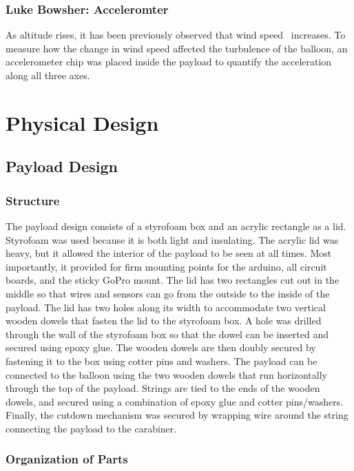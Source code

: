 \documentclass[12pt,]{article}
\begin{document}
\subsubsection{Luke Bowsher:
Acceleromter}\label{luke-bowsher-acceleromter}

As altitude rises, it has been previously observed that wind speed
~increases. To measure how the change in wind speed affected the
turbulence of the balloon, an accelerometer chip was placed inside the
payload to quantify the acceleration along all three axes.

\section{Physical Design}\label{physical-design}

\subsection{Payload Design}\label{payload-design}

\subsubsection{Structure}\label{structure}

The payload design consists of a styrofoam box and an acrylic rectangle
as a lid. Styrofoam was used because it is both light and insulating.
The acrylic lid was heavy, but it allowed the interior of the payload to
be seen at all times. Most importantly, it provided for firm mounting
points for the arduino, all circuit boards, and the sticky GoPro mount.
The lid has two rectangles cut out in the middle so that wires and
sensors can go from the outside to the inside of the payload. The lid
has two holes along its width to accommodate two vertical wooden dowels
that fasten the lid to the styrofoam box. A hole was drilled through the
wall of the styrofoam box so that the dowel can be inserted and secured
using epoxy glue. The wooden dowels are then doubly secured by fastening
it to the box using cotter pins and washers. The payload can be
connected to the balloon using the two wooden dowels that run
horizontally through the top of the payload. Strings are tied to the
ends of the wooden dowels, and secured using a combination of epoxy glue
and cotter pins/washers. Finally, the cutdown mechanism was secured by
wrapping wire around the string connecting the payload to the carabiner.

\subsubsection{Organization of Parts}\label{organization-of-parts}
\end{document}
